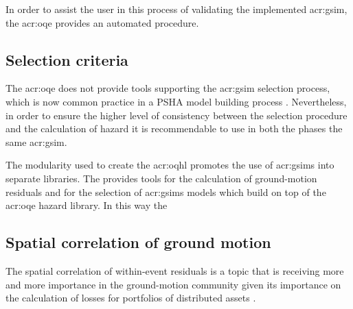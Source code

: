 In order to assist the user in this process of validating the implemented 
\gls{acr:gsim}, the \gls{acr:oqe} provides an automated procedure. 
%
\subsection{Selection criteria}
The \gls{acr:oqe} does not provide tools supporting the \gls{acr:gsim}
selection process, which is now common practice in a PSHA model building 
process \parencite[see for example][]{delavaud2012}. Nevertheless, in order 
to ensure the higher level of consistency between the selection procedure and
the calculation of hazard it is recommendable to use in both the phases the 
same \gls{acr:gsim}. 

The modularity used to create the {acr:oqhl} promotes the use of 
\glspl{acr:gsim} into separate libraries. The %
\parencite{weatherill2014} provides tools for the calculation of ground-motion
residuals and for the selection of \glspl{acr:gsim} models which build on top 
of the \gls{acr:oqe} hazard library. In this way the 
%
\subsection{Spatial correlation of ground motion}
The spatial correlation of within-event residuals is a topic that is 
receiving more and more importance in the ground-motion community given 
its importance on the calculation of losses for portfolios of distributed 
assets \parencite{crowley2006}.
